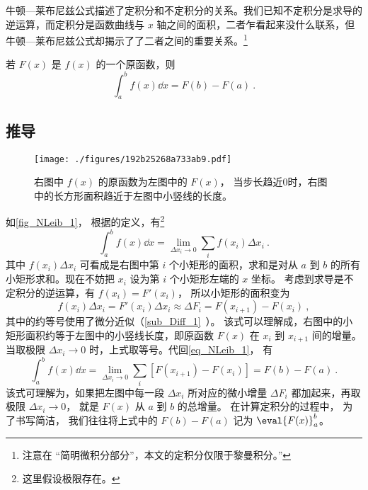 

牛顿—莱布尼兹公式描述了定积分和不定积分的关系。我们已知不定积分是求导的逆运算，而定积分是函数曲线与 $x$ 轴之间的面积，二者乍看起来没什么联系，但牛顿—莱布尼兹公式却揭示了了二者之间的重要关系。\footnote{注意在 “简明微积分部分”，本文的定积分仅限于黎曼积分。”}

若 $F(x)$ 是 $f(x)$ 的一个原函数，则
\begin{equation}\label{eq_NLeib_1}
\int_a^b f(x) \dd{x}  = F(b) - F(a)~.
\end{equation}

\subsection{推导}
\begin{figure}[ht]
\centering
\texttt{[image: ./figures/192b25268a733ab9.pdf]}
\caption{右图中 $f(x)$ 的原函数为左图中的 $F(x)$， 当步长趋近0时，右图中的长方形面积趋近于左图中小竖线的长度。}\label{fig_NLeib_1}
\end{figure}

如\autoref{fig_NLeib_1}， 根据的定义，有\footnote{这里假设极限存在。}
\begin{equation}
\int_a^b f(x) \dd{x}= \lim_{\Delta x_i\to 0}\sum_i f(x_i)\Delta x_i~.
\end{equation}
其中 $f(x_i)\Delta x_i$ 可看成是右图中第 $i$ 个小矩形的面积，求和是对从 $a$ 到 $b$ 的所有小矩形求和。现在不妨把 $x_i$ 设为第 $i$ 个小矩形左端的 $x$ 坐标。 考虑到求导是不定积分的逆运算，有 $f(x_i)=F'(x_i)$， 所以小矩形的面积变为
\begin{equation}
f(x_i)\Delta x_i = F'(x_i)\Delta x_i \approx \Delta F_i = F(x_{i+1})-F(x_i)~,
\end{equation}
其中的约等号使用了微分近似（\autoref{sub_Diff_1}~）。 该式可以理解成，右图中的小矩形面积约等于左图中的小竖线长度，即原函数 $F(x)$ 在 $x_i$ 到 $x_{i+1}$ 间的增量。当取极限 $\Delta x_i \to 0$ 时，上式取等号。代回\autoref{eq_NLeib_1}， 有
\begin{equation}
\int_a^b f(x) \dd{x}= \lim_{\Delta x_i\to 0}\sum_i [F(x_{i+1})-F(x_i)] = F(b)-F(a)~.
\end{equation}
该式可理解为，如果把左图中每一段 $\Delta x_i$ 所对应的微小增量 $\Delta F_i$ 都加起来，再取极限 $\Delta x_i \to 0$， 就是 $F(x)$ 从 $a$ 到 $b$ 的总增量。 在计算定积分的过程中， 为了书写简洁， 我们往往将上式中的 $F(b) - F(a)$ 记为 $\eval{F(x)}_a^b$。

